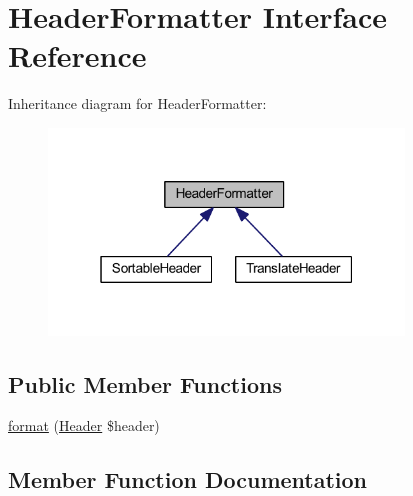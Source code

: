 \hypertarget{interfacehamburgscleanest_1_1_data_tables_1_1_interfaces_1_1_header_formatter}{}\section{Header\+Formatter Interface Reference}
\label{interfacehamburgscleanest_1_1_data_tables_1_1_interfaces_1_1_header_formatter}


Inheritance diagram for Header\+Formatter\+:\nopagebreak
\begin{figure}[H]
\begin{center}
\leavevmode
\includegraphics[width=268pt]{interfacehamburgscleanest_1_1_data_tables_1_1_interfaces_1_1_header_formatter__inherit__graph}
\end{center}
\end{figure}
\subsection*{Public Member Functions}
\begin{DoxyCompactItemize}
\item 
\hyperlink{interfacehamburgscleanest_1_1_data_tables_1_1_interfaces_1_1_header_formatter_aa5aeddf9c056d9583b29322f75f70f82}{format} (\hyperlink{classhamburgscleanest_1_1_data_tables_1_1_models_1_1_header}{Header} \$header)
\end{DoxyCompactItemize}


\subsection{Member Function Documentation}
\mbox{\label{interfacehamburgscleanest_1_1_data_tables_1_1_interfaces_1_1_header_formatter_aa5aeddf9c056d9583b29322f75f70f82}} 
